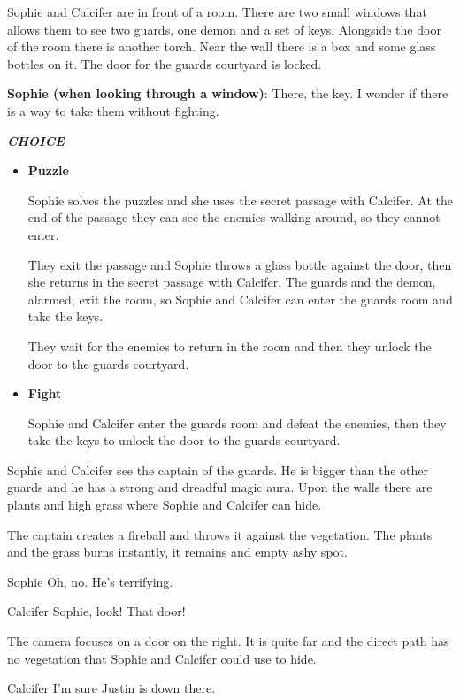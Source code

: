 
Sophie and Calcifer are in front of a room. There are two small windows that allows them to see two guards, one demon and a set of keys. Alongside the door of the room there is another torch. Near the wall there is a box and some glass bottles on it. The door for the guards courtyard is locked.

\textbf{Sophie (when looking through a window)}: There, the key. I wonder if there is a way to take them without fighting.

\textit{\textbf{CHOICE}}
\begin{itemize}
  \item \textbf{Puzzle}
  
  Sophie solves the puzzles and she uses the secret passage with Calcifer. At the end of the passage they can see the enemies walking around, so they cannot enter.
  
  They exit the passage and Sophie throws a glass bottle against the door, then she returns in the secret passage with Calcifer. The guards and the demon, alarmed, exit the room, so Sophie and Calcifer can enter the guards room and take the keys.
  
  They wait for the enemies to return in the room and then they unlock the door to the guards courtyard.

  \item \textbf{Fight}
  
  Sophie and Calcifer enter the guards room and defeat the enemies, then they take the keys to unlock the door to the guards courtyard.
\end{itemize}


\begin{screenplay}

Sophie and Calcifer see the captain of the guards. He is bigger than the other guards and he has a strong and dreadful magic aura. Upon the walls there are plants and high grass where Sophie and Calcifer can hide.

The captain creates a fireball and throws it against the vegetation. The plants and the grass burns instantly, it remains and empty ashy spot.

\begin{dialogue}{Sophie}
Oh, no. He's terrifying.
\end{dialogue}

\begin{dialogue}{Calcifer}
Sophie, look! That door!
\end{dialogue}

The camera focuses on a door on the right. It is quite far and the direct path has no vegetation that Sophie and Calcifer could use to hide.

\begin{dialogue}[continuing]{Calcifer}
I'm sure Justin is down there.
\end{dialogue}

\end{screenplay}
\vspace{1em}

